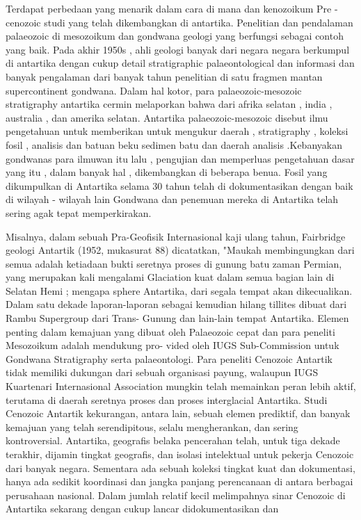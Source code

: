 		Terdapat perbedaan yang menarik dalam cara di mana dan kenozoikum Pre - cenozoic studi yang telah dikembangkan di antartika.
	Penelitian dan pendalaman palaeozoic di mesozoikum dan gondwana  geologi yang berfungsi sebagai contoh yang baik. Pada akhir 1950s , 
	ahli geologi banyak dari negara negara berkumpul di antartika dengan cukup detail stratigraphic palaeontological dan informasi dan banyak pengalaman 
	dari banyak tahun penelitian di satu fragmen mantan supercontinent gondwana. Dalam hal kotor, para palaeozoic-mesozoic stratigraphy antartika 
	cermin melaporkan bahwa dari afrika selatan , india , australia , dan amerika selatan. Antartika palaeozoic-mesozoic disebut ilmu pengetahuan untuk 
	memberikan untuk mengukur daerah , stratigraphy , koleksi fosil , analisis dan batuan beku sedimen batu dan daerah analisis .Kebanyakan gondwanas  
	para ilmuwan itu lalu , pengujian dan memperluas pengetahuan dasar yang itu , dalam banyak hal , dikembangkan di beberapa benua. 
	Fosil yang dikumpulkan di Antartika selama 30 tahun telah di dokumentasikan dengan baik di wilayah - wilayah lain Gondwana dan penemuan mereka di Antartika 
	telah sering agak tepat memperkirakan. 
	
		Misalnya, dalam sebuah Pra-Geofisik Internasional kaji ulang tahun, Fairbridge geologi Antartik (1952, mukasurat 88) dicatatkan, 
	"Maukah membingungkan dari semua adalah ketiadaan bukti seretnya proses di gunung batu zaman Permian, yang merupakan kali mengalami Glaciation 
	kuat dalam semua bagian lain di Selatan Hemi ; mengapa sphere Antartika, dari segala tempat akan dikecualikan. Dalam satu dekade laporan-laporan 
	sebagai kemudian hilang tillites dibuat dari Rambu Supergroup dari Trans- Gunung dan lain-lain tempat Antartika. Elemen penting dalam kemajuan yang 
	dibuat oleh Palaeozoic cepat dan para peneliti Mesozoikum adalah mendukung pro- vided oleh IUGS Sub-Commission untuk Gondwana Stratigraphy serta 
	palaeontologi. Para peneliti Cenozoic Antartik tidak memiliki dukungan dari sebuah organisasi payung, walaupun IUGS Kuartenari Internasional Association 
	mungkin telah memainkan peran lebih aktif, terutama di daerah seretnya proses dan proses interglacial Antartika. Studi Cenozoic Antartik kekurangan, 
	antara lain, sebuah elemen prediktif, dan banyak kemajuan yang telah serendipitous, selalu mengherankan, dan sering kontroversial. 
	Antartika, geografis belaka pencerahan telah, untuk tiga dekade terakhir, dijamin tingkat geografis, dan isolasi intelektual untuk pekerja Cenozoic 
	dari banyak negara. Sementara ada sebuah koleksi tingkat kuat dan dokumentasi, hanya ada sedikit koordinasi dan jangka panjang perencanaan di antara 
	berbagai perusahaan nasional. Dalam jumlah relatif kecil melimpahnya sinar Cenozoic di Antartika sekarang dengan cukup lancar didokumentasikan dan 

